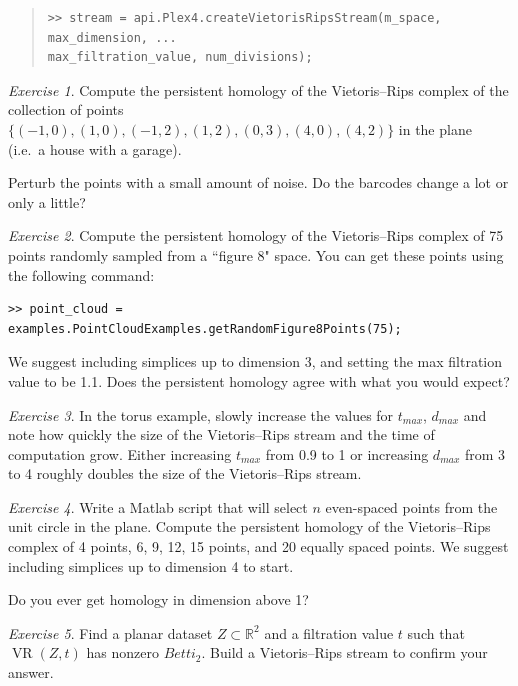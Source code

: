 \documentclass[amscd, amssymb, verbatim]{amsart}[12pt]
\theoremstyle{remark}
\newtheorem{exercise}{Exercise}
\theoremstyle{remark}
\theoremstyle{remark}
\DeclareMathOperator{\VR}{VR}
\newcommand{\R}{\mathbb{R}}
\begin{document}
\begin{quote} \begin{verbatim}
>> stream = api.Plex4.createVietorisRipsStream(m_space, max_dimension, ...
max_filtration_value, num_divisions);  
\end{verbatim} \end{quote}

\begin{exercise}
Compute the persistent homology of the Vietoris--Rips complex of the collection of points $\{(-1,0),(1,0),(-1,2),(1,2),(0,3),(4,0),(4,2)\}$ in the plane (i.e.\ a house with a garage).

Perturb the points with a small amount of noise. Do the barcodes change a lot or only a little?
\end{exercise}

\begin{exercise}
Compute the persistent homology of the Vietoris--Rips complex of 75 points randomly sampled from a ``figure 8" space. You can get these points using the following command:

\begin{verbatim}
>> point_cloud = examples.PointCloudExamples.getRandomFigure8Points(75);
\end{verbatim}

We suggest including simplices up to dimension 3, and setting the max filtration value to be 1.1. Does the persistent homology agree with what you would expect?
\end{exercise}

\begin{exercise}
In the torus example, slowly increase the values for $t_{max}$, $d_{max}$ and note how quickly the size of the Vietoris--Rips stream and the time of computation grow. Either increasing $t_{max}$ from 0.9 to 1 or increasing $d_{max}$ from 3 to 4 roughly doubles the size of the Vietoris--Rips stream. 
\end{exercise}

\begin{exercise}
Write a Matlab script that will select $n$ even-spaced points from the unit circle in the plane. Compute the persistent homology of the Vietoris--Rips complex of 4 points, 6, 9, 12, 15 points, and 20 equally spaced points. We suggest including simplices up to dimension 4 to start.

Do you ever get homology in dimension above 1?
\end{exercise}

\begin{exercise}
Find a planar dataset $Z \subset \R^2$ and a filtration value $t$ such that $\VR(Z,t)$ has nonzero $Betti_2$. Build a Vietoris--Rips stream to confirm your answer. 
\end{exercise}
\end{document}
